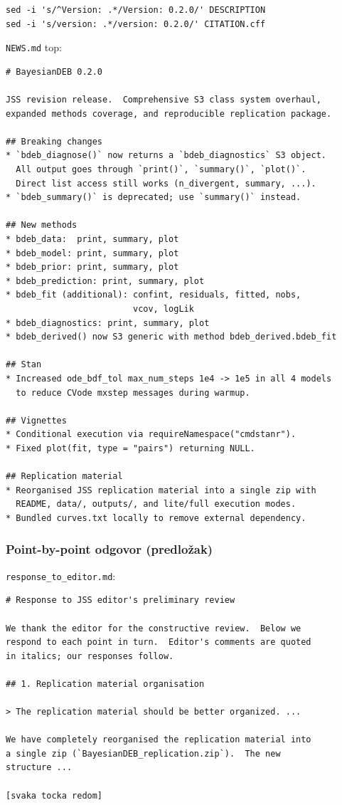 \documentclass[11pt,a4paper]{article}
\newcommand{\file}[1]{\texttt{\small #1}}
\begin{document}
\begin{lstlisting}[style=Shellstyle]
sed -i 's/^Version: .*/Version: 0.2.0/' DESCRIPTION
sed -i 's/version: .*/version: 0.2.0/' CITATION.cff
\end{lstlisting}

\noindent \file{NEWS.md} top:

\begin{lstlisting}[style=Stanstyle]
# BayesianDEB 0.2.0

JSS revision release.  Comprehensive S3 class system overhaul,
expanded methods coverage, and reproducible replication package.

## Breaking changes
* `bdeb_diagnose()` now returns a `bdeb_diagnostics` S3 object.
  All output goes through `print()`, `summary()`, `plot()`.
  Direct list access still works (n_divergent, summary, ...).
* `bdeb_summary()` is deprecated; use `summary()` instead.

## New methods
* bdeb_data:  print, summary, plot
* bdeb_model: print, summary, plot
* bdeb_prior: print, summary, plot
* bdeb_prediction: print, summary, plot
* bdeb_fit (additional): confint, residuals, fitted, nobs,
                         vcov, logLik
* bdeb_diagnostics: print, summary, plot
* bdeb_derived() now S3 generic with method bdeb_derived.bdeb_fit

## Stan
* Increased ode_bdf_tol max_num_steps 1e4 -> 1e5 in all 4 models
  to reduce CVode mxstep messages during warmup.

## Vignettes
* Conditional execution via requireNamespace("cmdstanr").
* Fixed plot(fit, type = "pairs") returning NULL.

## Replication material
* Reorganised JSS replication material into a single zip with
  README, data/, outputs/, and lite/full execution modes.
* Bundled curves.txt locally to remove external dependency.
\end{lstlisting}

\subsubsection*{Point-by-point odgovor (predložak)}

\file{response\_to\_editor.md}:

\begin{lstlisting}[style=Stanstyle]
# Response to JSS editor's preliminary review

We thank the editor for the constructive review.  Below we
respond to each point in turn.  Editor's comments are quoted
in italics; our responses follow.

## 1. Replication material organisation

> The replication material should be better organized. ...

We have completely reorganised the replication material into
a single zip (`BayesianDEB_replication.zip`).  The new
structure ...

[svaka tocka redom]
\end{lstlisting}
\end{document}
